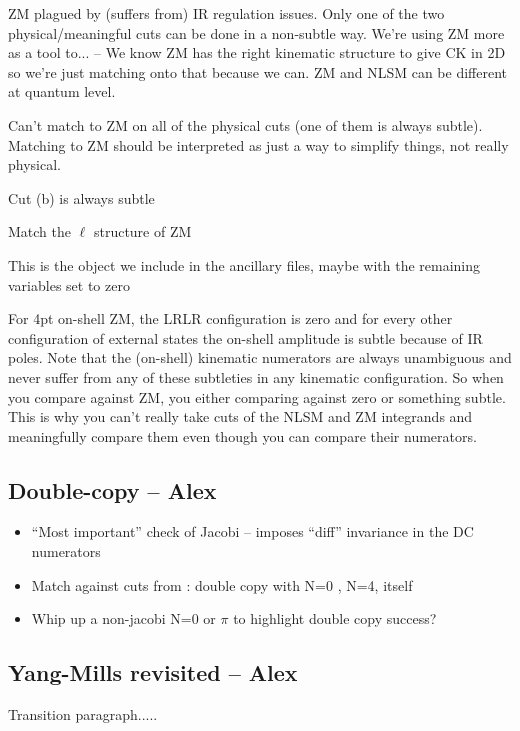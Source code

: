 \documentclass[11pt,letter]{article}
\begin{document}
ZM plagued by (suffers from) IR regulation issues.
Only one of the two physical/meaningful cuts can be done in a non-subtle way.
We're using ZM more as a tool to... -- We know ZM has the right kinematic structure to give CK in 2D so we're just matching onto that because we can.  ZM and NLSM can be different at quantum level.

Can't match to ZM on all of the physical cuts (one of them is always subtle).  Matching to ZM should be interpreted as just a way to simplify things, not really physical.

Cut (b) is always subtle

Match the $\ell$ structure of ZM

This is the object we include in the ancillary files, maybe with the remaining variables set to zero

For 4pt on-shell ZM, the LRLR configuration is zero and for every other configuration of external states the on-shell amplitude is subtle because of IR poles.  Note that the (on-shell) kinematic numerators are always unambiguous and never suffer from any of these subtleties in any kinematic configuration.  So when you compare against ZM, you either comparing against zero or something subtle.  This is why you can't really take cuts of the NLSM and ZM integrands and meaningfully compare them even though you can compare their numerators.

\subsection{Double-copy -- Alex }

\begin{itemize}
\item  ``Most important'' check of Jacobi -- imposes ``diff'' invariance in the DC numerators
\item Match against cuts from \cite{Carrasco:2023qgz}: double copy
  with N=0 \cite{Bern:2015ooa}, N=4, itself
  \item Whip up a non-jacobi N=0 or $\pi$ to highlight double copy success?
\end{itemize}

\subsection{Yang-Mills revisited -- Alex}
Transition paragraph.....
\end{document}
